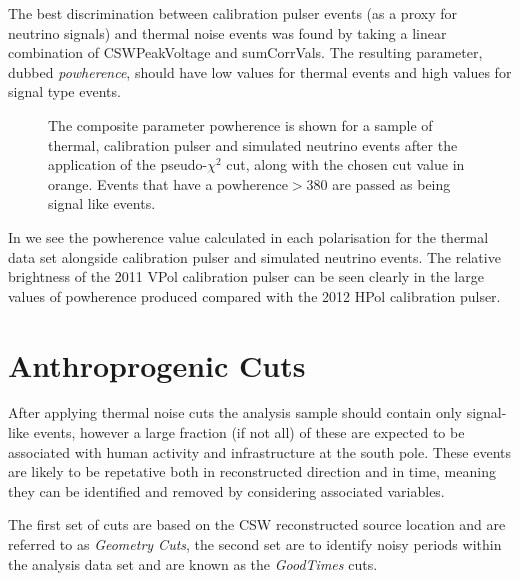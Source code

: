 The best discrimination between calibration pulser events (as a proxy for neutrino signals) and thermal noise events was found by taking a linear combination of CSWPeakVoltage and sumCorrVals. The resulting parameter, dubbed \textit{powherence}, should have low values for thermal events and high values for signal type events.


\begin{figure}
  \hfill
  \caption{The composite parameter powherence is shown for a sample of thermal, calibration pulser and simulated neutrino events after the application of the pseudo-$\chi^{2}$ cut, along with the chosen cut value in orange. Events that have a $\mbox{powherence} > 380$ are passed as being signal like events.}
  \label{fig:Analysis:Thermal-Cuts:Powherence}
\end{figure}

In  we see the powherence value calculated in each polarisation for the thermal data set alongside calibration pulser and simulated neutrino events. The relative brightness of the 2011 VPol calibration pulser can be seen clearly in the large values of powherence produced compared with the 2012 HPol calibration pulser.


\section{Anthroprogenic Cuts}
\label{sec:Analysis:Anthroprogenic-Cuts}

After applying thermal noise cuts the analysis sample should contain only signal-like events, however a large fraction (if not all) of these are expected to be associated with human activity and infrastructure at the south pole. These events are likely to be repetative both in reconstructed direction and in time, meaning they can be identified and removed by considering associated variables.

The first set of cuts are based on the CSW reconstructed source location and are referred to as \textit{Geometry Cuts}, the second set are to identify noisy periods within the analysis data set and are known as the \textit{GoodTimes} cuts.

\subsection{}

